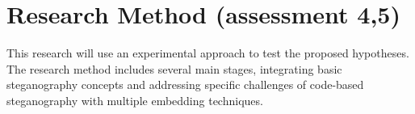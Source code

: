 \documentclass{ittelkom}
\begin{document}



\section{Research Method \color{red}(assessment 4,5)}

This research will use an experimental approach to test the proposed
hypotheses. The research method includes several main stages, integrating basic
steganography concepts and addressing specific challenges of code-based
steganography with multiple embedding techniques.
\end{document}

